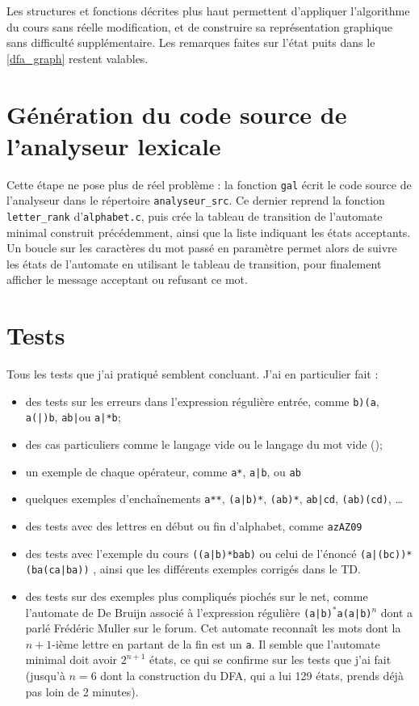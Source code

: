 \documentclass[12pt, a4paper]{article}
\begin{document}
Les structures et fonctions décrites plus haut permettent d'appliquer l'algorithme du cours sans réelle modification, et de construire sa représentation graphique sans difficulté supplémentaire. Les remarques faites sur l'état puits dans le \ref{dfa_graph} restent valables.

\section{Génération du code source de l'analyseur lexicale}

Cette étape ne pose plus de réel problème : la fonction \texttt{gal} écrit le code source de l'analyseur dans le répertoire \texttt{analyseur\_src}. Ce dernier reprend la fonction \texttt{letter\_rank} d'\texttt{alphabet.c}, puis crée la tableau de transition de l'automate minimal construit précédemment, ainsi que la liste indiquant les états acceptants. Un boucle sur les caractères du mot passé en paramètre permet alors de suivre les états de l'automate en utilisant le tableau de transition, pour finalement afficher le message acceptant ou refusant ce mot. 

\section{Tests}

Tous les tests que j'ai pratiqué semblent concluant. J'ai en particulier fait :
\begin{itemize}
\item des tests sur les erreurs dans l'expression régulière entrée, comme \og\texttt{b)(a}\fg, \og\texttt{a(|)b}\fg, \og\texttt{ab|}\fg ou \og\texttt{a|*b}\fg;
\item des cas particuliers comme le langage vide \og \fg{} ou le langage du mot vide \og()\fg;
\item un exemple de chaque opérateur, comme \og\texttt{a*}\fg, \og\texttt{a|b}\fg, ou \og\texttt{ab}\fg
\item quelques exemples d'enchaînements \og\texttt{a**}\fg, \og\texttt{(a|b)*}\fg, \texttt{(ab)*}, \og\texttt{ab|cd}\fg, \og\texttt{(ab)(cd)}\fg, \dots
\item des tests avec des lettres en début ou fin d'alphabet, comme \og\texttt{azAZ09}\fg
\item des tests avec l'exemple du cours \og \texttt{((a|b)*bab)} \fg{} ou celui de l'énoncé \og \texttt{(a|(bc))*(ba(ca|ba))} \fg{}, ainsi que les différents exemples corrigés dans le TD.
\item des tests sur des exemples plus compliqués piochés sur le net, comme l'automate de De Bruijn associé à l'expression régulière \og \texttt{(a|b)$^*$a(a|b)$^n$} \fg{} dont a parlé Frédéric Muller sur le forum. Cet automate  reconnaît les mots dont la $n+1$-ième lettre en partant de la fin est un \texttt{a}. Il semble que l'automate minimal doit avoir $2^{n+1}$ états, ce qui se confirme sur les tests que j'ai fait (jusqu'à $n=6$ dont la construction du DFA, qui a lui 129 états, prends déjà pas loin de 2 minutes).

\end{itemize}
\end{document}
